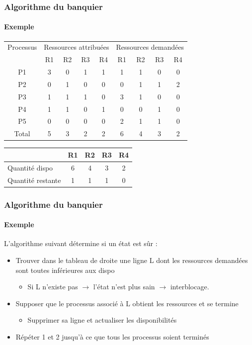 \begin{frame}
\frametitle{Algorithme du banquier}
\framesubtitle{Exemple}
\begin{tabular}{|c|c|c|c|c|c|c|c|c|}
\hline
Processus & \multicolumn{4}{c|}{Ressources attribuées} & \multicolumn{4}{c|}{Ressources demandées} \\
 & R1 & R2 & R3 & R4 & R1 & R2 & R3 & R4 \\
\hline
P1   &3&0&1&1&1&1&0&0 \\
P2   &0&1&0&0&0&1&1&2\\ 
P3   &1&1&1&0&3&1&0&0\\
P4   &1&1&0&1&0&0&1&0\\
P5   &0&0&0&0&2&1&1&0\\
\hline
Total&5&3&2&2&6&4&3&2\\
\hline
\end{tabular}

\begin{center}
\begin{tabular}{|l|c|c|c|c|}
\hline
& R1 & R2 & R3 & R4 \\
\hline
Quantité dispo & 6 & 4 & 3 & 2 \\
Quantité restante & 1 & 1 & 1 & 0 \\
\hline
\end{tabular}
\end{center}
\end{frame}

\begin{frame}
\frametitle{Algorithme du banquier}
\framesubtitle{Exemple}
L'algorithme suivant détermine si un état est sûr :
\begin{itemize}
\item <1->Trouver dans le tableau de droite une ligne L dont les ressources demandées sont toutes inférieures aux dispo 
\begin{itemize}
\item Si L n'existe pas $\rightarrow$ l'état n'est plus sain $\rightarrow$ interblocage.
\end{itemize}

\item <2->Supposer que le processus associé à L obtient les ressources et se termine
\begin{itemize}
\item Supprimer sa ligne et actualiser les disponibilités
\end{itemize}

\item <3->Répéter 1 et 2 jusqu'à ce que tous les processus soient terminés
\end{itemize}
\end{frame}

